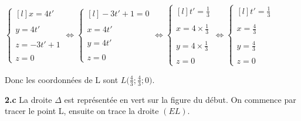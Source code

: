 \documentclass{article}
\begin{document}
$\left\{\begin{matrix*}[l]
   x= 4t'\\
   \\
   y=4t'\\
   \\
   z=-3t'+1\\
   \\
   z = 0
\end{matrix*}\right.
\Leftrightarrow\left\{\begin{matrix*}[l]
   -3t'+1=0\\
   \\
   x = 4t'\\
   \\
   y = 4t'\\
   \\
   z = 0
\end{matrix*}\right.
\Leftrightarrow
\left\{\begin{matrix*}[l]
   t' = \displaystyle\frac{1}{3}\\
   \\
   x = 4 \times \displaystyle\frac{1}{3}\\
   \\
   y = 4 \times \displaystyle\frac{1}{3}\\
   \\
   z = 0
\end{matrix*}\right.
\Leftrightarrow
\left\{\begin{matrix*}[l]
   t' = \displaystyle\frac{1}{3}\\
   \\
   x = \displaystyle\frac{4}{3}\\
   \\
   y = \displaystyle\frac{4}{3}\\
   \\
   z = 0
\end{matrix*}\right.
$

\vspace{2mm}

\noindent Donc les coordonnées de L sont $L\Bigg(\displaystyle\frac{4}{3}; \displaystyle\frac{4}{3}; 0\Bigg)$.

\vspace{2mm}

\textbf{2.c} \noindent La droite $\Delta$ est représentée en vert sur la figure du début. On commence par tracer le point L, ensuite on trace la droite $(EL)$.

\vspace{2mm}
\end{document}

